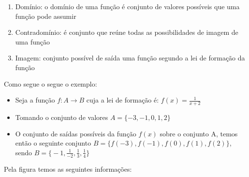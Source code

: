 \begin{multicols*}{2}
            \begin{enumerate}
            \item Domínio: o domínio de uma função é conjunto de valores possíveis que uma função pode 				assumir
            \item Contradomínio: é conjunto que reúne todas as possibilidades de imagem de uma função
            \item Imagem: conjunto possível de saída uma função segundo a lei de formação da função
            \end{enumerate}
            Como segue o segue o exemplo:
            
            \begin{itemize}
            \item Seja a função $f: A \rightarrow B$ cuja a lei de formação é: $f(x) = \frac{1}{x+2}$
            \item Tomando o conjunto de valores $A = \{-3,-1,0,1,2 \}$
            \item O conjunto de saídas possíveis da função $f(x)$ sobre o conjunto A, temos então o 				seguinte conjunto $B = \{f(-3),f(-1),f(0),f(1),f(2) \}$, sendo 
            $B = \Big\{ -1, \frac{1}{-2}, \frac{1}{3}, \frac{1}{4} \Big\}$				
            \end{itemize}
    
            
    Pela figura temos as seguintes informações:
    
    
    \begin{tikzpicture}[x=0.75pt,y=0.75pt,yscale=-1,xscale=1]
    

\end{tikzpicture}
\end{multicols*}
